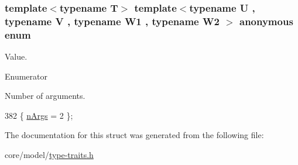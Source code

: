 \subsubsection[{\texorpdfstring{anonymous enum}{anonymous enum}}]{\setlength{\rightskip}{0pt plus 5cm}template$<$typename T$>$ template$<$typename U , typename V , typename W1 , typename W2 $>$ anonymous enum}\hypertarget{structTypeTraits_1_1PtrToMemberTraits_3_01U_07V_1_1_5_08_07W1_00_01W2_08_01const_01_01_4_a3f0c4eeb82e815513256955f2068e041}{}\label{structTypeTraits_1_1PtrToMemberTraits_3_01U_07V_1_1_5_08_07W1_00_01W2_08_01const_01_01_4_a3f0c4eeb82e815513256955f2068e041}
Value. \begin{Desc}
\item[Enumerator]\par
\begin{description}
\item[{\em 
n\+Args\hypertarget{structTypeTraits_1_1PtrToMemberTraits_3_01U_07V_1_1_5_08_07W1_00_01W2_08_01const_01_01_4_a3f0c4eeb82e815513256955f2068e041a5561fb5dad735ae60b4d21a94e3c22be}{}\label{structTypeTraits_1_1PtrToMemberTraits_3_01U_07V_1_1_5_08_07W1_00_01W2_08_01const_01_01_4_a3f0c4eeb82e815513256955f2068e041a5561fb5dad735ae60b4d21a94e3c22be}
}]Number of arguments. \end{description}
\end{Desc}

\begin{DoxyCode}
382 \{ \hyperlink{structTypeTraits_1_1PtrToMemberTraits_3_01U_07V_1_1_5_08_07W1_00_01W2_08_01const_01_01_4_a3f0c4eeb82e815513256955f2068e041a5561fb5dad735ae60b4d21a94e3c22be}{nArgs} = 2                \};
\end{DoxyCode}


The documentation for this struct was generated from the following file\+:\begin{DoxyCompactItemize}
\item 
core/model/\hyperlink{type-traits_8h}{type-\/traits.\+h}\end{DoxyCompactItemize}
